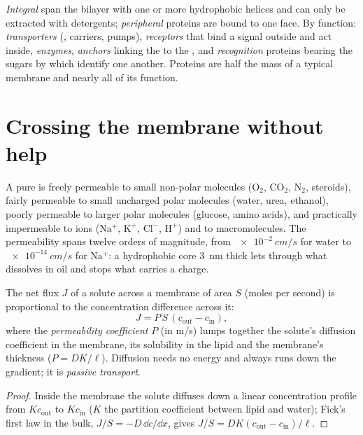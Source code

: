 \begin{definition}\label{def:b1:membranes-transport:proteins}
\emph{Integral}  span the
bilayer with one or more hydrophobic helices and can only be extracted
with detergents; \emph{peripheral} proteins are bound to one face. By
function: \emph{transporters} (, carriers, pumps),
\emph{receptors} that bind a signal outside and act inside,
\emph{enzymes}, \emph{anchors} linking the  to the
, and \emph{recognition} proteins bearing the
sugars by which  identify one another. Proteins are half the mass
of a typical membrane and nearly all of its function.
\end{definition}

\section{Crossing the membrane without help}

\begin{proposition}\label{prop:b1:membranes-transport:permeability}
A pure  is freely permeable to small non-polar molecules
($\mathrm{O_2}$, $\mathrm{CO_2}$, $\mathrm{N_2}$, steroids), fairly
permeable to small uncharged polar molecules (water, urea, ethanol),
poorly permeable to larger polar molecules (glucose, amino acids), and
practically impermeable to ions ($\mathrm{Na^+}$, $\mathrm{K^+}$,
$\mathrm{Cl^-}$, $\mathrm{H^+}$) and to macromolecules. The
permeability spans twelve orders of magnitude, from
$\qty{e-2}{cm/s}$ for water to $\qty{e-14}{cm/s}$ for $\mathrm{Na^+}$:
a hydrophobic core \qty{3}{nm} thick lets through what dissolves in
oil and stops what carries a charge.
\end{proposition}

\begin{theorem}\label{thm:b1:membranes-transport:fick}
The net flux $J$ of a solute across a membrane of area $S$ (moles
per second) is proportional to the concentration difference across it:
\[
J = P\,S\,(c_{\text{out}} - c_{\text{in}}),
\]
where the \emph{permeability coefficient} $P$ (in \unit{m/s}) lumps
together the solute's diffusion coefficient in the membrane, its
solubility in the lipid and the membrane's thickness ($P = DK/\ell$).
Diffusion needs no energy and always runs down the gradient; it is
\emph{passive transport}.
\end{theorem}
\begin{proof}
Inside the membrane the solute diffuses down a linear concentration
profile from $Kc_{\text{out}}$ to $Kc_{\text{in}}$ ($K$ the partition
coefficient between lipid and water); Fick's first law in the bulk,
$J/S = -D\,\dd c/\dd x$, gives $J/S = DK(c_{\text{out}} -
c_{\text{in}})/\ell$.
\end{proof}

